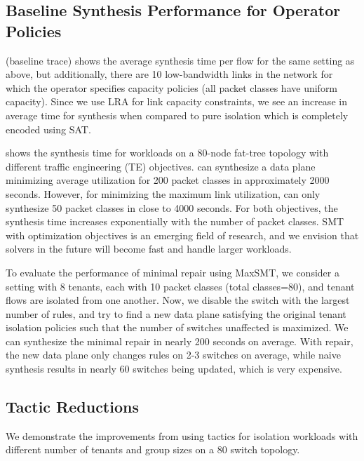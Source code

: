 \subsection{Baseline Synthesis Performance for Operator Policies} \label{sec:optimizationeval}
 (baseline trace) 
shows the average synthesis time per flow for the same setting as above, but
additionally, there are 10 low-bandwidth links in the network for which the operator
specifies capacity policies (all packet classes have uniform capacity). 
Since we use LRA for link capacity constraints, we see an 
increase in average time for synthesis 
when compared to pure isolation which is completely 
encoded using SAT. 

  
shows the synthesis time for workloads on a 80-node fat-tree topology
with different traffic engineering (TE) objectives. \name can synthesize a data plane
minimizing average utilization for 200 packet classes in approximately 2000 seconds. 
However, for minimizing the maximum link utilization, 
\name can only synthesize 50 packet classes in close to 4000 seconds. For both
objectives, the synthesis time increases exponentially with the number of packet classes. 
SMT with optimization objectives is an emerging field of research, 
and we envision that solvers in the future will become fast
and handle larger workloads. 

To evaluate the performance of minimal repair using MaxSMT, we
consider a setting with 8 tenants, each with 10
packet classes (total classes=80), and tenant flows are isolated from
one another. Now, we disable the switch with the largest number of
rules, and try to find a new data plane
satisfying the original tenant isolation policies such that the 
number of switches unaffected is maximized. We can
synthesize the minimal repair in nearly 200 seconds on average. 
With repair, the new data plane only changes rules on
 2-3 switches on average, while naive synthesis results in 
 nearly 60 switches being updated, which is very expensive.
 \subsection{Tactic Reductions} \label{sec:tacticeval}
 We 
 demonstrate the improvements from using tactics for isolation
 workloads with different number of tenants and group sizes on a 
 80 switch topology.
 
